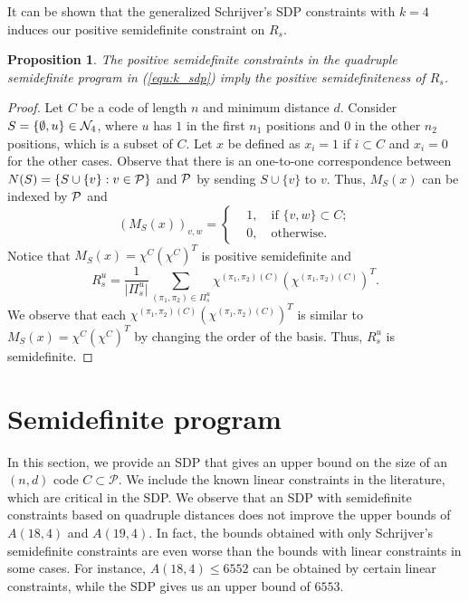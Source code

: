 \documentclass[final,onecolumn]{IEEEtran}
\newtheorem{propositionenv}[definitionenv]{Proposition}
\newenvironment{proposition}{\begin{propositionenv}\rm}{\end{propositionenv}}
\theoremstyle{definition}
\newcommand{\cP}{{\mathcal P}}
\begin{document}
It can be shown that the generalized Schrijver's SDP constraints with $k = 4$ induces our positive semidefinite constraint on $R_{s}$.

\begin{proposition}
       The positive semidefinite constraints in the quadruple semidefinite program in (\ref{equ:k_sdp}) imply the positive semidefiniteness of $R_{s}$.
\end{proposition}

\begin{proof}
    Let $C$ be a code of length $n$ and minimum distance $d$. Consider $S = \{\emptyset, u\}  \in {\cal N}_{4}$,
   where $u$ has $1$ in the first $n_{1}$ positions and $0$ in the other $n_{2}$ positions,  which is a subset of $ C$.  Let $x$ be defined as $x_{i} = 1$ if $i \subset C$ and $x_{i} = 0$ for the other cases. Observe that there is an one-to-one correspondence between $N(S) = \{S \cup \{v\} : v \in {\cal P}\}$ and ${\cal P}$ by sending $S \cup \{v\}$ to $v$. Thus,  $M_{S}(x)$ can be indexed by ${\cal P}$ and  
    \begin{equation*}
        \left( M_{S}(x)\right)_{v, w} = \left\{
        \begin{aligned}
            &1, \quad \text{if } \{v, w\} \subset C;\\
            &0,  \quad \text{otherwise.}
        \end{aligned}\right.
    \end{equation*}
    Notice that $M_{S}(x) = \chi^{C} (\chi^{C})^{T}$ is positive semidefinite and
    \begin{equation*}
        R_{s}^{u} = \frac{1}{\lvert \Pi_{s}^{u}\rvert} \sum_{(\pi_{1}, \pi_{2}) \in \Pi_{s}^{u}} \chi^{(\pi_{1}, \pi_{2})(C)} (\chi^{(\pi_{1}, \pi_{2})(C)})^{T}.
    \end{equation*}
    We observe that each $\chi^{(\pi_{1}, \pi_{2})(C)} (\chi^{(\pi_{1}, \pi_{2})(C)})^{T}$ is similar to $M_{S}(x) = \chi^{C} (\chi^{C})^{T}$ by changing the order of the basis. Thus, $R_{s}^{u}$ is semidefinite.
\end{proof}
	
	
\section{Semidefinite program} \label{sec:SDP}
In this section, we provide an SDP  that gives an upper bound on the size of an $(n,d)$ code $C\subset \cP$. We include the  known linear constraints in the literature, which are critical in the SDP. We observe that an SDP with semidefinite constraints based on quadruple distances \cite{GMS12} does not improve the upper bounds of $A(18, 4)$ and $A(19, 4)$. In fact, the bounds obtained with only Schrijver's semidefinite constraints are even worse than the bounds with linear constraints \cite{Del73, Bes80} in some cases. For instance, $A(18, 4) \leq 6552$ can be obtained by certain linear constraints, while the SDP gives us an upper bound of $6553$.
	
\end{document}
